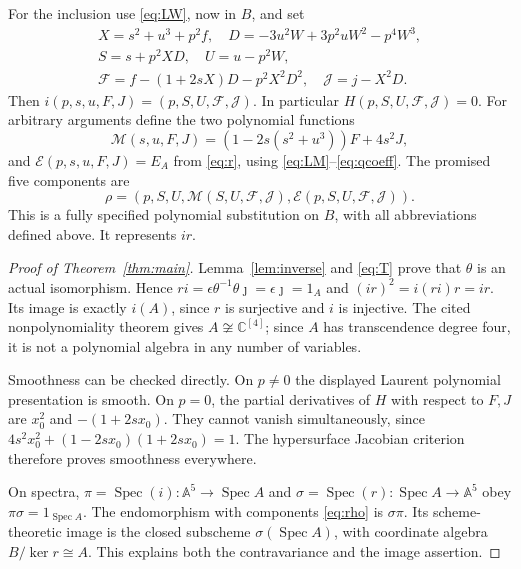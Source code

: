 \documentclass[11pt]{article}
\newcommand{\C}{\mathbb C}
\newcommand{\A}{\mathbb A}
\newcommand{\Spec}{\operatorname{Spec}}
\begin{document}
For the inclusion use \eqref{eq:LW}, now in $B$, and set
\begin{equation}\label{eq:inclusion}
\begin{gathered}
X=s^2+u^3+p^2f,\quad D=-3u^2W+3p^2uW^2-p^4W^3,\\
S=s+p^2XD,\quad U=u-p^2W,\\
\mathcal F=f-(1+2sX)D-p^2X^2D^2,\quad
\mathcal J=j-X^2D.
\end{gathered}
\end{equation}
Then $i(p,s,u,F,J)=(p,S,U,\mathcal F,\mathcal J)$.
In particular $H(p,S,U,\mathcal F,\mathcal J)=0$.
For arbitrary arguments define the two polynomial functions
\[
\mathcal M(s,u,F,J)=(1-2s(s^2+u^3))F+4s^2J,
\]
and $\mathcal E(p,s,u,F,J)=E_A$ from \eqref{eq:r}, using
\eqref{eq:LM}--\eqref{eq:qcoeff}. The promised five components are
\begin{equation}\label{eq:rho}
\boxed{\rho=(p,S,U,
\mathcal M(S,U,\mathcal F,\mathcal J),
\mathcal E(p,S,U,\mathcal F,\mathcal J)).}
\end{equation}
This is a fully specified polynomial substitution on $B$, with all
abbreviations defined above. It represents $i r$.

\begin{proof}[Proof of Theorem~\ref{thm:main}]
Lemma~\ref{lem:inverse} and \eqref{eq:T} prove that $\theta$ is an
actual isomorphism. Hence
$r i=\epsilon\theta^{-1}\theta\jmath=\epsilon\jmath=1_A$ and
$(i r)^2=i(r i)r=i r$. Its image is exactly $i(A)$, since $r$ is
surjective and $i$ is injective. The cited nonpolynomiality theorem
\cite[Theorem 1.1]{OAI} gives $A\not\cong\C^{[4]}$; since $A$ has
transcendence degree four, it is not a polynomial algebra in any number
of variables.

Smoothness can be checked directly. On $p\ne0$ the displayed Laurent
polynomial presentation is smooth. On $p=0$, the partial derivatives
of $H$ with respect to $F,J$ are $x_0^2$ and $-(1+2sx_0)$.
They cannot vanish simultaneously, since
$4s^2x_0^2+(1-2sx_0)(1+2sx_0)=1$. The hypersurface Jacobian criterion
therefore proves smoothness everywhere.

On spectra, $\pi=\Spec(i):\A^5\to\Spec A$ and
$\sigma=\Spec(r):\Spec A\to\A^5$ obey
$\pi\sigma=1_{\Spec A}$. The endomorphism with components \eqref{eq:rho}
is $\sigma\pi$. Its scheme-theoretic image is the closed subscheme
$\sigma(\Spec A)$, with coordinate algebra $B/\ker r\cong A$.
This explains both the contravariance and the image assertion.
\end{proof}
\end{document}

